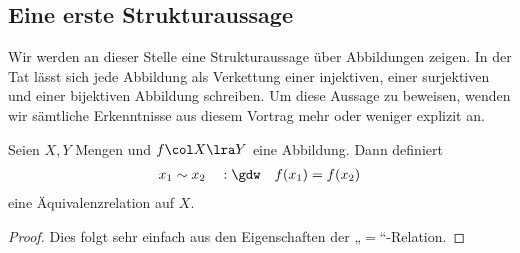 \subsection{Eine erste Strukturaussage}


Wir werden an dieser Stelle eine Strukturaussage über Abbildungen
zeigen. In der Tat lässt sich jede Abbildung als Verkettung einer
injektiven, einer surjektiven und einer bijektiven Abbildung schreiben. Um
diese Aussage zu beweisen, wenden wir sämtliche Erkenntnisse aus diesem
Vortrag mehr oder weniger explizit an.


\begin{bem}
\label{bem:niveau}

  Seien $X,Y$ Mengen und $f\col X \lra Y$ eine Abbildung. Dann definiert
  \begin{align*}
    x_{1} \sim x_{2} \quad :\gdw \quad f(x_{1}) = f(x_{2})
  \end{align*}
  eine Äquivalenzrelation auf $X$.
  \begin{proof}
    Dies folgt sehr einfach aus den Eigenschaften der „$=$“-Relation.
  \end{proof}
\end{bem}


